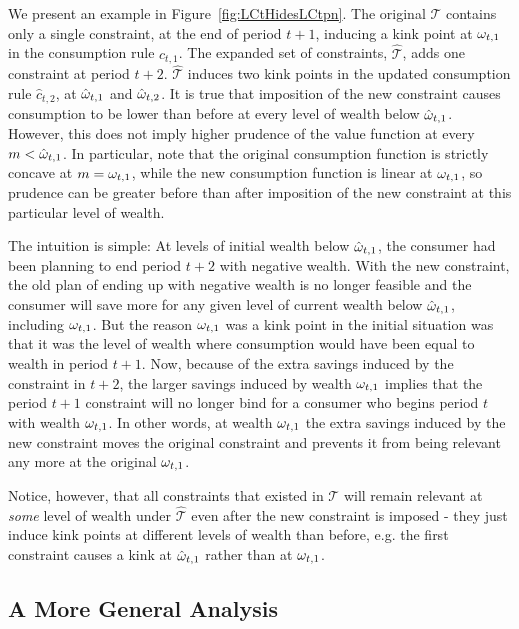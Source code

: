 We present an example in Figure~\ref{fig:LCtHidesLCtpn}. The original $\mathcal{T}$ contains only a single constraint, at the end of period $t+1$, inducing a kink point at $\omega_{t,1}$ in the consumption rule $c_{t,1}$. The expanded set of constraints, $\hat{\mathcal{T}}$, adds one constraint at period $t+2$. $\hat{\mathcal{T}}$ induces two kink points in the updated consumption rule $\hat{c}_{t,2}$, at $\hat{\omega}_{t,1}$ and $\hat{\omega}_{t,2}$.  It is true that imposition of the new constraint causes consumption to be lower than before at every level of wealth below $\hat{\omega}_{t,1}$.  However, this does not imply higher prudence of the value function at every ${m} <\hat{\omega}_{t,1}$.  In particular, note that the original consumption function is strictly concave at ${m} = \omega_{t,1}$, while the new consumption function is linear at $\omega_{t,1}$, so prudence can be greater before than after imposition of the new constraint at this particular level of wealth.

The intuition is simple: At levels of initial wealth below $\hat{\omega}_{t,1}$, the consumer had been planning to end period $t+2$ with negative wealth. With the new constraint, the old plan of ending up with negative wealth is no longer feasible and the consumer will save more for any given level of current wealth below $\hat{\omega}_{t,1}$, including $\omega_{t,1}$. But the reason $\omega_{t,1}$ was a kink point in the initial situation was that it was the level of wealth where consumption would have been equal to wealth in period $t+1$. Now, because of the extra savings induced by the constraint in $t+2$, the larger savings induced by wealth $\omega_{t,1}$ implies that the period $t+1$ constraint will no longer bind for a consumer who begins period $t$ with wealth $\omega_{t,1}$. In other words, at wealth $\omega_{t,1}$ the extra savings induced by the new constraint moves the original constraint and prevents it from being relevant any more at the original $\omega_{t,1}$.

Notice, however, that all constraints that existed in $\mathcal{T}$ will remain relevant at \textit{some} level of wealth under $\hat{\mathcal{T}}$ even after the new constraint is imposed - they just induce kink points at different levels of wealth than before, e.g. the first constraint causes a kink at $\hat{\omega}_{t,1}$ rather than at $\omega_{t,1}$.

\subsection{A More General Analysis}
\label{subsubsec:MoreGenConstr}

